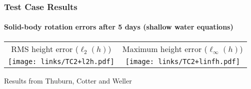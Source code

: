 \begin{frame}
\frametitle{Test Case Results}
\framesubtitle{Solid-body rotation errors after 5 days (shallow water equations)}

\begin{tabular}{cc}
RMS height error ($\ell_2(h)$)
&
Maximum height error ($\ell_\infty(h)$)
\\
\texttt{[image: links/TC2+l2h.pdf]}
&
\texttt{[image: links/TC2+linfh.pdf]}
\end{tabular}

Results from Thuburn, Cotter and Weller

\end{frame}

